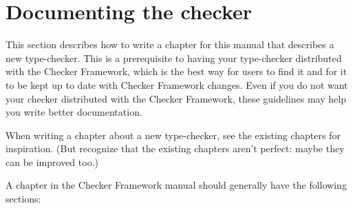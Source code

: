 


\section{Documenting the checker\label{creating-documenting-a-checker}}

This section describes how to write a chapter for this manual that
describes a new type-checker.  This is a prerequisite to having your
type-checker distributed with the Checker Framework, which is the best way
for users to find it and for it to be kept up to date with Checker
Framework changes.  Even if you do not want your checker distributed with
the Checker Framework, these guidelines may help you write better
documentation.

When writing a chapter about a new type-checker, see the existing chapters
for inspiration.  (But recognize that the existing chapters aren't perfect:
maybe they can be improved too.)

A chapter in the Checker Framework manual should generally have the
following sections:

